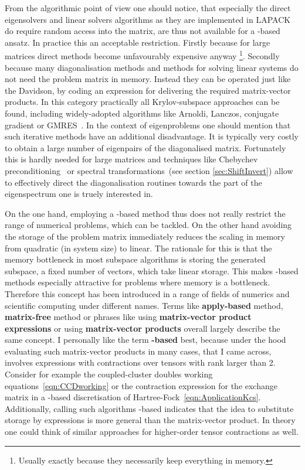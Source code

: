 From the algorithmic point of view one should notice,
that especially the direct eigensolvers and linear solvers algorithms
as they are implemented in LAPACK\cite{LAPACK}
do require random access into the matrix,
are thus not available for a \contraction-based ansatz.
In practice this an acceptable restriction.
Firstly because for large matrices direct methods become
unfavourably expensive anyway%
\footnote{Usually exactly because they necessarily keep everything in memory.}.
Secondly because many diagonalisation methods and methods for solving linear systems
do not need the problem matrix in memory.
Instead they can be operated just like the Davidson,
by coding an expression for delivering the required matrix-vector products.
In this category practically all Krylov-subspace approaches can be found,
including widely-adopted algorithms like
Arnoldi, Lanczos, conjugate gradient or GMRES~\cite{Saad2003,Arbenz2010,Saad2011}.
In the context of eigenproblems
one should mention that such iterative methods
have an additional disadvantage.
It is typically very costly to obtain a large number of eigenpairs
of the diagonalised matrix.
Fortunately this is hardly needed for large matrices
and techniques like Chebychev preconditioning~
or spectral transformations~(see section \vref{sec:ShiftInvert})
allow to effectively direct the diagonalisation routines
towards the part of the eigenspectrum one is truely interested in.

On the one hand, employing a \contraction-based method thus does not really
restrict the range of numerical problems, which can be tackled.
On the other hand avoiding the storage of the problem matrix
immediately reduces the scaling in memory from quadratic (in system size) to linear.
The rationale for this is that the memory bottleneck
in most subspace algorithms is storing the generated subspace,
\ie a fixed number of vectors, which take linear storage.
This makes \contraction-based methods especially
attractive for problems where memory is a bottleneck.
Therefore this concept has been
introduced in a range of fields of numerics and scientific computing
under different names.
Terms like \textbf{apply-based} method, \textbf{matrix-free} method
or phrases like using \textbf{matrix-vector product expressions}
or using \textbf{matrix-vector products}
overall largely describe the same concept.
I personally like the term \textbf{\contraction-based} best,
because under the hood
evaluating such matrix-vector products in many cases,
that I came across,
involves expressions with contractions over tensors with rank larger than 2.
Consider for example the coupled-cluster doubles working equations~\eqref{eqn:CCDworking}
or the contraction expression for the exchange matrix
in a \CS-based discretisation of Hartree-Fock~\eqref{eqn:ApplicationKcs}.
Additionally, calling such algorithms \contraction-based
indicates that the idea to substitute storage by expressions
is more general than the matrix-vector product.
In theory one could think of similar approaches for
higher-order tensor contractions as well.

